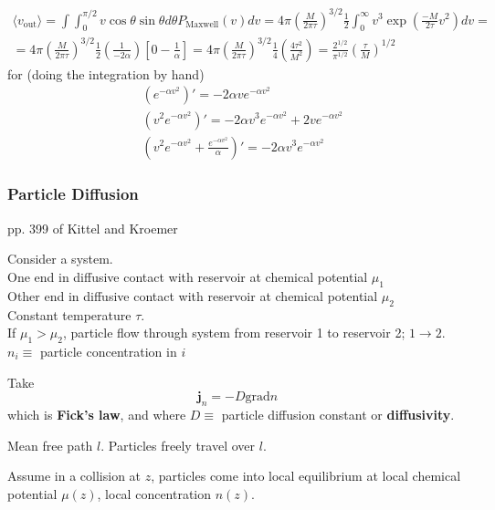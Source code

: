 \documentclass[twoside]{amsart}
\theoremstyle{plain}
\theoremstyle{definition}
\begin{document}
\[
\begin{gathered}
  \langle v_{\text{out}} \rangle = \int \int_0^{\pi/2} v\cos{\theta} \sin{\theta} d\theta P_{\text{Maxwell}}(v) dv = 4\pi \left( \frac{ M}{ 2\pi \tau} \right)^{3/2} \frac{1}{2} \int_0^{\infty} v^3 \exp{ \left( \frac{-M}{2\tau} v^2 \right) } dv = \\
  = 4\pi \left( \frac{M}{2\pi \tau} \right)^{3/2} \frac{1}{2} \left( \frac{1}{-2\alpha} \right) \left[ 0 - \frac{1}{\alpha} \right] = 4\pi \left( \frac{ M}{2\pi \tau} \right)^{3/2} \frac{1}{4} \left( \frac{4\tau^2}{M^2} \right) = \boxed{ \frac{ 2^{1/2} }{ \pi^{1/2} } \left( \frac{\tau}{M} \right)^{1/2} }
\end{gathered}
\]
for (doing the integration by hand) 
\[
\begin{aligned}
  & (e^{-\alpha v^2} )' = -2\alpha v e^{-\alpha v^2} \\
  & (v^2 e^{-\alpha v^2} )' = -2\alpha v^3 e^{-\alpha v^2} + 2v e^{-\alpha v^2} \\ 
  & (v^2 e^{-\alpha v^2} + \frac{e^{-\alpha v^2} }{ \alpha } )' = -2\alpha v^3 e^{-\alpha v^2}
\end{aligned}
\]




\subsubsection*{Particle Diffusion}

pp. 399 of Kittel and Kroemer \cite{CKittelHKroemer1980}

Consider a system.  \\
One end in diffusive contact with reservoir at chemical potential $\mu_1$ \\
Other end in diffusive contact with reservoir at chemical potential $\mu_2$ \\
Constant temperature $\tau$.  \\
If $\mu_1 > \mu_2$, particle flow through system from reservoir 1 to reservoir 2; $1\to 2$.   \\
$n_i \equiv $ particle concentration in $i$ 

Take
\begin{equation}
\mathbf{j}_n = -D \text{grad}n
\end{equation}
which is \textbf{Fick's law}, and where $D \equiv$ particle diffusion constant or \textbf{diffusivity}.  

Mean free path $l$.  Particles freely travel over $l$.  

Assume in a collision at $z$, particles come into local equilibrium at local chemical potential $\mu(z)$, local concentration $n(z)$.  
\end{document}
